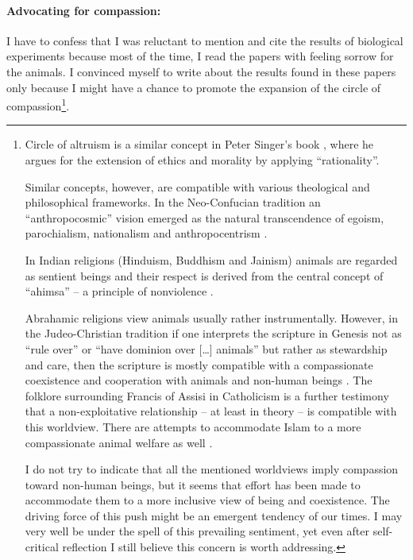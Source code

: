 \documentclass{article}
\begin{document}
\paragraph{Advocating for compassion:}
I have to confess that I was reluctant to mention and cite the results of biological experiments because most of the time, I read the papers with feeling sorrow for the animals.
I convinced myself to write about the results found in these papers only because I might have a chance to promote the expansion of the circle of compassion\footnote{Circle of altruism is a similar concept in Peter Singer's book \cite{book:ExpandingCircle}, where he argues for the extension of ethics and morality by applying ``rationality''. 

Similar concepts, however, are compatible with various theological and philosophical frameworks. In the Neo-Confucian tradition an ``anthropocosmic'' vision emerged as the natural transcendence of egoism, parochialism, nationalism and anthropocentrism \cite{paper:TuWeimingNewConfucianHumanism}. 

In Indian religions (Hinduism, Buddhism and Jainism) animals are regarded as sentient beings \cite{book:EncyclopediaOfBuddhism} and their respect is derived from the central concept of ``ahimsa'' -- a principle of nonviolence \cite{britannica:Ahimsa}. 

Abrahamic religions view animals usually rather instrumentally. However, in the Judeo-Christian tradition if one interprets the scripture in Genesis not as ``rule over'' or ``have dominion over [\dots] animals'' but rather as stewardship and care, then the scripture is mostly compatible with a compassionate coexistence and cooperation with animals and non-human beings \cite{book:OnAnimalsInChristianity}. The folklore surrounding Francis of Assisi in Catholicism is a further testimony that a non-exploitative relationship -- at least in theory -- is compatible with this worldview. There are attempts to accommodate Islam to a more compassionate animal welfare as well \cite{paper:AnimalWelfareIslam}.

I do not try to indicate that all the mentioned worldviews imply compassion toward non-human beings, but it seems that effort has been made to accommodate them to a more inclusive view of being and coexistence. The driving force of this push might be an emergent tendency of our times. I may very well be under the spell of this prevailing sentiment, yet even after self-critical reflection I still believe this concern is worth addressing. 
}.
\end{document}
